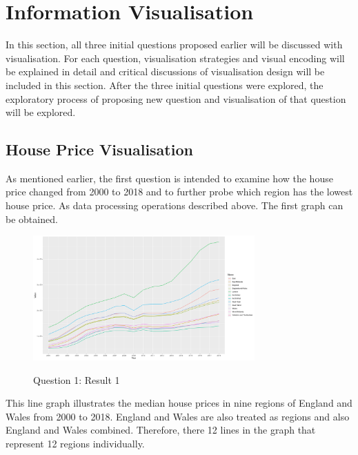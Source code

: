 \documentclass{article}
\begin{document}
\section{Information Visualisation}
In this section, all three initial questions proposed earlier will be discussed with visualisation. 
For each question, visualisation strategies and visual encoding will be explained in detail and critical discussions of visualisation design will be included in this section. After the three initial questions were explored, the exploratory process of proposing new question and visualisation of that question will be explored.

\subsection{House Price Visualisation}
As mentioned earlier, the first question is intended to examine how the house price changed from 2000 to 2018 
and to further probe which region has the lowest house price. As data processing operations described above. 
The first graph can be obtained.

\begin{figure}[H]
  \begin{minipage}[b]{1.0\linewidth}
    \centering
    \centerline{\includegraphics[width=8.5cm]{Q1Geom_line}}
    \centerline{Question 1: Result 1}\medskip
  \end{minipage}
\end{figure}

This line graph illustrates the median house prices in nine regions of England and Wales from 2000 to 2018. 
England and Wales are also treated as regions and also England and Wales combined. Therefore, there 12 lines in the graph that represent 12 regions individually. 
\end{document}
